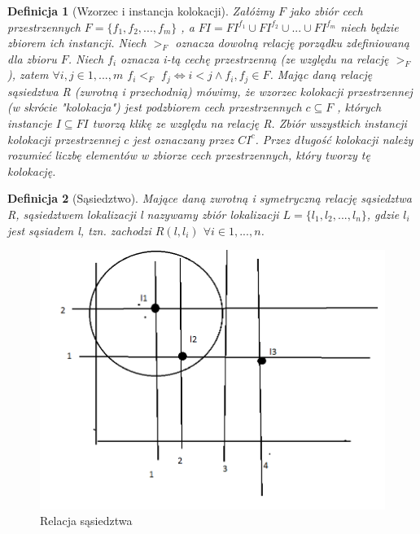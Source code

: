 \documentclass[12pt]{article}
\newtheorem{defin}{Definicja}
\begin{document}
\begin{defin}[Wzorzec i instancja kolokacji]
Załóżmy $F$ jako zbiór cech przestrzennych $F = \{ f_{1}, f_{2}, ...,f_{m} \} $ , a $FI = FI^{f_{1}} \cup FI^{f_{2}} \cup ... \cup FI^{f_{m}}$ niech będzie
zbiorem ich instancji. Niech $ >_{F} $ oznacza dowolną relację porządku zdefiniowaną dla zbioru $ F $. Niech $ f_{i} $ oznacza i-tą cechę przestrzenną (ze względu na relację $ >_{F} $), zatem $ \forall i,j \in 1,...,m $ $ f_{i} <_{F} $ $ f_{j} \Leftrightarrow i < j \land f_{i},f_{j} \in F $. Mając daną relację sąsiedztwa R (zwrotną i przechodnią) mówimy, że wzorzec kolokacji przestrzennej (w skrócie "kolokacja") jest podzbiorem cech przestrzennych $ c \subseteq F $ , których instancje $ I\subseteq FI $ tworzą klikę ze względu na relację R. Zbiór wszystkich instancji kolokacji przestrzennej $c$ jest oznaczany przez $CI^{c} $. Przez długość kolokacji należy rozumieć liczbę elementów w zbiorze cech przestrzennych, który tworzy tę kolokację.
\end{defin}

\begin{defin}[Sąsiedztwo]
Mające daną zwrotną i symetryczną relację sąsiedztwa R, sąsiedztwem lokalizacji l nazywamy zbiór lokalizacji $L = \{l_{1},l_{2}, . . . , l_{n}\}$, gdzie $l_{i}$ jest sąsiadem l, tzn. zachodzi $R(l, l_{i}) $ $ \forall i \in 1,...,n$.
\end{defin}

\begin{figure}[H]
\centering
\includegraphics{neighbourhood}
\caption{Relacja sąsiedztwa}
\end{figure}
\end{document}

